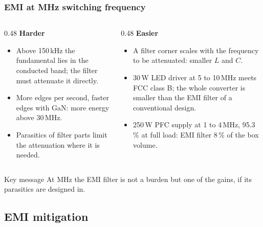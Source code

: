 \begin{frame}
	\frametitle{EMI at MHz switching frequency}
	\begin{columns}[T]
		\begin{column}{0.48\textwidth}
			\small
			\textbf{Harder}
			\begin{itemize}
				\item Above 150\,kHz the fundamental lies in the conducted band; the filter must attenuate it directly.
				\item More edges per second, faster edges with GaN: more energy above 30\,MHz.
				\item Parasitics of filter parts limit the attenuation where it is needed.
			\end{itemize}
		\end{column}
		\begin{column}{0.48\textwidth}
			\small
			\textbf{Easier}
			\begin{itemize}
				\item A filter corner scales with the frequency to be attenuated: smaller $L$ and $C$.
				\item 30\,W LED driver at 5 to 10\,MHz meets FCC class B; the whole converter is smaller than the EMI filter of a conventional design.
				\item 250\,W PFC supply at 1 to 4\,MHz, 95.3\,\% at full load: EMI filter 8\,\% of the box volume.
			\end{itemize}
		\end{column}
	\end{columns}
	\begin{block}{Key message}
		At MHz the EMI filter is not a burden but one of the gains, if its parasitics are designed in.
	\end{block}
\end{frame}

\subsection{EMI mitigation}

